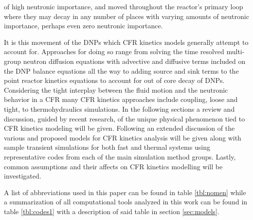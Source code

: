 \documentclass[review]{elsarticle}
\begin{document}
of high neutronic importance, and moved throughout the reactor's primary loop
where they may decay in any number of places with varying amounts of
neutronic importance, perhaps even zero neutronic importance. 
\par It is this movement of the DNPs which CFR kinetics models generally
attempt to account for. Approaches for doing so range from solving the 
time resolved multi-group neutron diffusion equations with advective and
diffusive terms included on the DNP balance equations all the way to adding
source and sink terms to the point reactor kinetics equations to account
for out of core decay of DNPs. Considering the tight interplay between the
fluid motion and the neutronic behavior in a CFR many CFR kinetics approaches
include coupling, loose and tight, to thermohydraulics simulations. In the
following sections a review and discussion, guided by recent research, of the
unique physical phenomenon tied to CFR kinetics modeling will be given. 
Following an extended discussion of the various and proposed models for CFR
kinetics analysis will be given along with sample transient simulations for
both fast and thermal systems using representative codes from each of the main
simulation method groups. Lastly, common assumptions and their affects on CFR
kinetics modelling will be investigated.
\par A list of abbreviations used in this paper can be found in table
\ref{tbl:nomen} while a summarization of all computational tools analyzed
in this work can be found in table \ref{tbl:codes1} with a description of said
table in section \ref{sec:models}.
\end{document}

